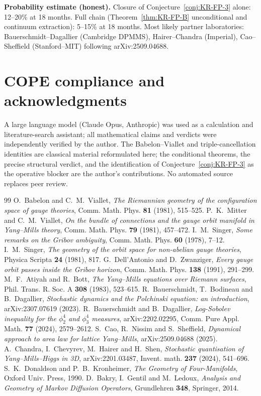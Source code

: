 \documentclass[11pt]{article}
\begin{document}
\textbf{Probability estimate (honest).} Closure of Conjecture~\ref{conj:KR-FP-3} alone: 12--20\% at 18 months. Full chain (Theorem~\ref{thm:KR-FP-B} unconditional and continuum extraction): 5--15\% at 18 months. Most likely partner laboratories: Bauerschmidt--Dagallier (Cambridge DPMMS), Hairer--Chandra (Imperial), Cao--Sheffield (Stanford--MIT) following arXiv:2509.04688.

\section*{COPE compliance and acknowledgments}
\small
A large language model (Claude Opus, Anthropic) was used as a calculation and literature-search assistant; all mathematical claims and verdicts were independently verified by the author. The Babelon--Viallet and triple-cancellation identities are classical material reformulated here; the conditional theorems, the precise structural verdict, and the identification of Conjecture~\ref{conj:KR-FP-3} as the operative blocker are the author's contributions. No automated source replaces peer review.

\begin{thebibliography}{99}
 O.~Babelon and C.~M.~Viallet, \emph{The Riemannian geometry of the configuration space of gauge theories}, Comm. Math. Phys. \textbf{81} (1981), 515--525.
 P.~K.~Mitter and C.~M.~Viallet, \emph{On the bundle of connections and the gauge orbit manifold in Yang--Mills theory}, Comm. Math. Phys. \textbf{79} (1981), 457--472.
 I.~M.~Singer, \emph{Some remarks on the Gribov ambiguity}, Comm. Math. Phys. \textbf{60} (1978), 7--12.
 I.~M.~Singer, \emph{The geometry of the orbit space for non-abelian gauge theories}, Physica Scripta \textbf{24} (1981), 817.
 G.~Dell'Antonio and D.~Zwanziger, \emph{Every gauge orbit passes inside the Gribov horizon}, Comm. Math. Phys. \textbf{138} (1991), 291--299.
 M.~F.~Atiyah and R.~Bott, \emph{The Yang--Mills equations over Riemann surfaces}, Phil. Trans. R. Soc. A \textbf{308} (1983), 523--615.
 R.~Bauerschmidt, T.~Bodineau and B.~Dagallier, \emph{Stochastic dynamics and the Polchinski equation: an introduction}, arXiv:2307.07619 (2023).
 R.~Bauerschmidt and B.~Dagallier, \emph{Log-Sobolev inequality for the $\phi^4_2$ and $\phi^4_3$ measures}, arXiv:2202.02295, Comm. Pure Appl. Math. \textbf{77} (2024), 2579--2612.
 S.~Cao, R.~Nissim and S.~Sheffield, \emph{Dynamical approach to area law for lattice Yang--Mills}, arXiv:2509.04688 (2025).
 A.~Chandra, I.~Chevyrev, M.~Hairer and H.~Shen, \emph{Stochastic quantisation of Yang--Mills--Higgs in 3D}, arXiv:2201.03487, Invent. math. \textbf{237} (2024), 541--696.
 S.~K.~Donaldson and P.~B.~Kronheimer, \emph{The Geometry of Four-Manifolds}, Oxford Univ. Press, 1990.
 D.~Bakry, I.~Gentil and M.~Ledoux, \emph{Analysis and Geometry of Markov Diffusion Operators}, Grundlehren \textbf{348}, Springer, 2014.
\end{thebibliography}
\end{document}

